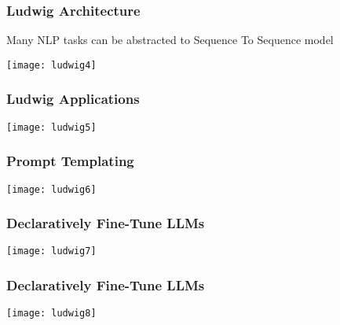 \begin{frame}[fragile]\frametitle{Ludwig Architecture}

Many NLP tasks can be abstracted to Sequence To Sequence model

		\begin{center}
		\texttt{[image: ludwig4]}
		\end{center}

\end{frame}


\begin{frame}[fragile]\frametitle{Ludwig Applications}

		\begin{center}
		\texttt{[image: ludwig5]}
		\end{center}

\end{frame}

\begin{frame}[fragile]\frametitle{Prompt Templating}

		\begin{center}
		\texttt{[image: ludwig6]}
		\end{center}

\end{frame}

\begin{frame}[fragile]\frametitle{Declaratively Fine-Tune LLMs}

		\begin{center}
		\texttt{[image: ludwig7]}
		\end{center}

\end{frame}

\begin{frame}[fragile]\frametitle{Declaratively Fine-Tune LLMs}

		\begin{center}
		\texttt{[image: ludwig8]}
		\end{center}

\end{frame}

